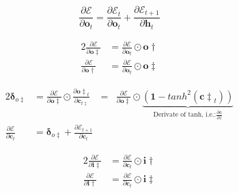 \documentclass[xcolor={table}]{beamer}
\begin{document}
 \begin{frame} 
\begin{equation}
\frac{\partial \mathcal{E}}{\partial \mathbf{o}_t} = \frac{\partial \mathcal{E}_t}{\partial \mathbf{o}_t}  + \frac{\partial \mathcal{E}_{t{+}1}}{\partial \mathbf{h}_{t}}
\label{eqn:lstmoutputerrgrad}
\end{equation}
\end{frame} 



 \begin{frame} 
\begin{alignat}{2}
\frac{\partial \mathcal{E}}{\partial \mathbf{o\ddagger}} & = \frac{\partial \mathcal{E}}{\partial \mathbf{o}_t} \odot \mathbf{o\dagger} \label{eqn:outputdoubledaggergradient}\\
\frac{\partial \mathcal{E}}{\partial \mathbf{o\dagger}} & = \frac{\partial \mathcal{E}}{\partial \mathbf{o}_t} \odot \mathbf{o\ddagger} \label{eqn:outputdaggergradient}
\end{alignat}
\end{frame} 



 \begin{frame} 
\begin{alignat}{2}
	\mathbf{\delta}_{o\ddagger} & = \frac{\partial \mathcal{E}}{\partial \mathbf{o\ddagger}} \odot \frac{\partial \mathbf{o\ddagger}_t}{\partial \mathbf{c}_{t\ddagger}}  &= & \frac{\partial \mathcal{E}}{\partial \mathbf{o\ddagger}} \odot \underbrace{\left(\mathbf{1} - tanh^2(\mathbf{c\ddagger}_t) \right)}_{\text{Derivate of tanh, i.e.:}\frac{\partial a}{\partial z}}	\label{eqn:outputTdelta}\\ 
\frac{\partial \mathcal{E}}{\partial \mathbf{c}_t} & = \mathbf{\delta}_{o\ddagger}+ \frac{\partial \mathcal{E}_{t{+}1}}{\partial \mathbf{c}_t} \label{eqn:mergeoutputerrandcellerr}
\end{alignat}
\end{frame} 



 \begin{frame} 
\begin{alignat}{2}
\frac{\partial \mathcal{E}}{\partial \mathbf{i\ddagger}} & = \frac{\partial \mathcal{E}}{\partial \mathbf{c}_t} \odot \mathbf{i\dagger} \label{eqn:inputdoubledaggergradient}\\
\frac{\partial \mathcal{E}}{\partial \mathbf{i\dagger}} & = \frac{\partial \mathcal{E}}{\partial \mathbf{c}_t} \odot \mathbf{i\ddagger} \label{eqn:inputdaggergradient}
\end{alignat}
\end{frame} 
\end{document}
